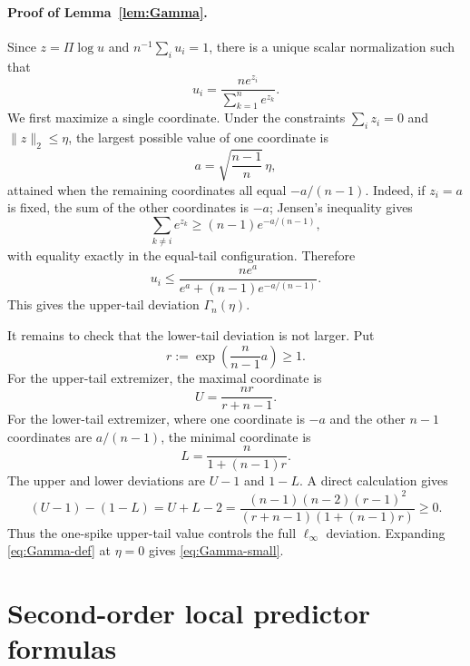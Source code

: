 \documentclass[11pt]{article}
\numberwithin{equation}{section}
\theoremstyle{plain}
\theoremstyle{definition}
\theoremstyle{remark}
\begin{document}
\paragraph{Proof of Lemma~\ref{lem:Gamma}.}
Since \(z=\Pi\log u\) and \(n^{-1}\sum_i u_i=1\), there is a unique scalar
normalization such that
\[
        u_i=\frac{n e^{z_i}}{\sum_{k=1}^n e^{z_k}}.
\]
We first maximize a single coordinate. Under the constraints \(\sum_i z_i=0\)
and \(\|z\|_2\le\eta\), the largest possible value of one coordinate is
\[
        a=\sqrt{\frac{n-1}{n}}\,\eta,
\]
attained when the remaining coordinates all equal \(-a/(n-1)\). Indeed, if
\(z_i=a\) is fixed, the sum of the other coordinates is \(-a\); Jensen's
inequality gives
\[
        \sum_{k\ne i}e^{z_k}
        \ge
        (n-1)e^{-a/(n-1)},
\]
with equality exactly in the equal-tail configuration. Therefore
\[
        u_i
        \le
        \frac{n e^a}{e^a+(n-1)e^{-a/(n-1)}}.
\]
This gives the upper-tail deviation \(\Gamma_n(\eta)\).

It remains to check that the lower-tail deviation is not larger. Put
\[
        r:=\exp\!\left(\frac{n}{n-1}a\right)\ge1.
\]
For the upper-tail extremizer, the maximal coordinate is
\[
        U=\frac{nr}{r+n-1}.
\]
For the lower-tail extremizer, where one coordinate is \(-a\) and the other
\(n-1\) coordinates are \(a/(n-1)\), the minimal coordinate is
\[
        L=\frac{n}{1+(n-1)r}.
\]
The upper and lower deviations are \(U-1\) and \(1-L\). A direct calculation
gives
\begin{equation}\label{eq:Gamma-tail-comparison}
        (U-1)-(1-L)
        =U+L-2
        =
        \frac{(n-1)(n-2)(r-1)^2}{(r+n-1)(1+(n-1)r)}
        \ge0.
\end{equation}
Thus the one-spike upper-tail value controls the full \(\ell_\infty\)
deviation. Expanding \eqref{eq:Gamma-def} at \(\eta=0\) gives
\eqref{eq:Gamma-small}.

\section{Second-order local predictor formulas}\label{app:second-order-predictor}
\end{document}

